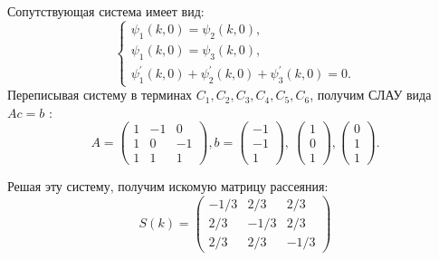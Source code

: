\documentclass[a4 paper, 12 pt]{extarticle}
\begin{document}
  Сопутствующая система имеет вид:
  \[\begin{cases}
  \psi_{1}\left(k,0\right)=\psi_2\left(k,0\right), \\
  \psi_{1}\left(k,0\right)=\psi_3\left(k,0\right), \\
  \psi_1^\prime\left(k,0\right)+\psi_2^\prime\left(k,0\right)+\psi_3^\prime\left(k,0\right)=0.
  \end{cases}
  \]
   Переписывая систему в терминах $C_1,C_2,C_3,C_4,C_5,C_6$, получим СЛАУ вида $Ac=b$ :
   \[ A = \left(\begin{smallmatrix}
   1 & -1 & 0 \\
   1 & 0 & -1 \\
   1 & 1 & 1
   \end{smallmatrix}\right), b = \left(\begin{smallmatrix}
   -1 \\
   -1 \\
   1
   \end{smallmatrix}\right), \ 
   \left(\begin{smallmatrix}
   1 \\
   0 \\
   1
   \end{smallmatrix}\right),
   \left(\begin{smallmatrix}
   0 \\
   1 \\
   1
   \end{smallmatrix}\right).\]
   
   Решая эту систему, получим искомую матрицу рассеяния:
   \begin{equation}
   \label{starData}
   S(k)=
   \begin{pmatrix}
   -1/3 & 2/3 & 2/3 \\
   2/3 & -1/3 & 2/3 \\
   2/3 & 2/3 & -1/3 
   \end{pmatrix}
   \end{equation}
   
\end{document}
